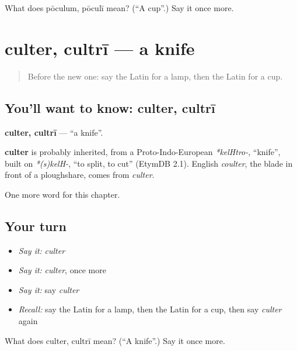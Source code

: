\begin{tcolorbox}[breakable,colback=teal!4,colframe=teal!35!black,title={Before you move on}]
What does pōculum, pōculī mean? (\textquotedblleft{}A cup\textquotedblright{}.) Say it once more.
\end{tcolorbox}
\section[culter, cultrī]{culter, cultrī — a knife}

\label{lesson:LA-C83-culter}



\begin{quote}
Before the new one: say the Latin for a lamp, then the Latin for a cup.
\end{quote}

\subsection*{You'll want to know: culter, cultrī}
\textbf{culter, cultrī} — \textquotedblleft{}a knife\textquotedblright{}.

\begin{cousinweb}
\textbf{culter} is probably inherited, from a Proto-Indo-European \emph{*kelHtro-}, \textquotedblleft{}knife\textquotedblright{}, built on \emph{*(s)kelH-}, \textquotedblleft{}to split, to cut\textquotedblright{} (EtymDB 2.1). English \emph{coulter}, the blade in front of a ploughshare, comes from \emph{culter}.
\end{cousinweb}

\begin{grammarlens}[title={What you've built}]
One more word for this chapter.
\end{grammarlens}

\subsection*{Your turn}
\begin{itemize}
\raggedright
  \item \emph{Say it:} \emph{culter}
  \item \emph{Say it:} \emph{culter}, once more
  \item \emph{Say it:} say \emph{culter}
  \item \emph{Recall:} say the Latin for a lamp, then the Latin for a cup, then say \emph{culter} again
\end{itemize}

\begin{tcolorbox}[breakable,colback=teal!4,colframe=teal!35!black,title={Before you move on}]
What does culter, cultrī mean? (\textquotedblleft{}A knife\textquotedblright{}.) Say it once more.
\end{tcolorbox}
